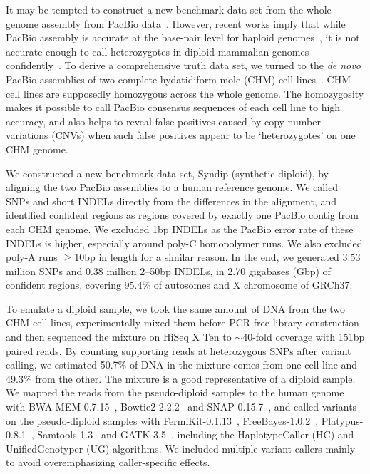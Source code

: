 \documentclass{bioinfo}
\begin{document}
It may be tempted to construct a new benchmark data set from the whole genome
assembly from PacBio data~\citep{Chin:2016aa}. However, recent works imply that while PacBio
assembly is accurate at the base-pair level for haploid
genomes~\citep{Chin:2013qr}, it is not accurate enough to call heterozygotes in
diploid mammalian genomes confidently~\citep{Gordon:2016kq,Seo:2016aa}.  To derive a
comprehensive truth data set, we turned to the \emph{de novo} PacBio
assemblies of two complete hydatidiform mole (CHM) cell
lines~\citep{Schneider072116}. CHM cell lines are supposedly homozygous across
the whole genome. The homozygosity makes it possible to call PacBio consensus
sequences of each cell line to high accuracy, and also helps to reveal false
positives caused by copy number variations (CNVs) when such false positives
appear to be `heterozygotes' on one CHM genome.

We constructed a new benchmark data set, Syndip (synthetic diploid), by aligning the
two PacBio assemblies to a human reference genome. We called SNPs and short
INDELs directly from the differences in the alignment, and identified confident
regions as regions covered by exactly one PacBio contig from each CHM genome.
We excluded 1bp INDELs as the PacBio error rate of these INDELs is higher,
especially around poly-C homopolymer runs. We also excluded poly-A runs
$\ge$10bp in length for a similar reason. In the end, we generated 3.53 million
SNPs and 0.38 million 2--50bp INDELs, in 2.70 gigabases (Gbp) of confident
regions, covering 95.4\% of autosomes and X chromosome of GRCh37.

To emulate a diploid sample, we took the same amount of DNA from the two CHM
cell lines, experimentally mixed them before PCR-free library construction and then
sequenced the mixture on HiSeq X Ten to $\sim$40-fold coverage with 151bp paired reads. By counting supporting
reads at heterozygous SNPs after variant calling, we estimated 50.7\% of DNA in
the mixture comes from one cell line and 49.3\% from the other. The mixture is
a good representative of a diploid sample. We mapped the reads from the
pseudo-diploid samples to the human genome with BWA-MEM-0.7.15~\citep{Li:2013aa},
Bowtie2-2.2.2~\citep{Langmead:2012fk} and SNAP-0.15.7~\citep{Bolosky:2014aa}, and called variants on the pseudo-diploid
samples with FermiKit-0.1.13~\citep{Li:2015eu},
FreeBayes-1.0.2~\citep{Garrison:2012aa}, Platypus-0.8.1~\citep{Rimmer:2014ab},
Samtools-1.3~\citep{Li:2011ab} and GATK-3.5~\citep{Depristo:2011vn}, including
the HaplotypeCaller (HC) and UnifiedGenotyper (UG) algorithms. We included
multiple variant callers mainly to avoid overemphasizing caller-specific
effects.
\end{document}
